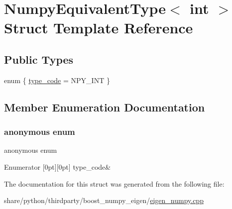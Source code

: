 \hypertarget{structNumpyEquivalentType_3_01int_01_4}{}\section{Numpy\+Equivalent\+Type$<$ int $>$ Struct Template Reference}
\label{structNumpyEquivalentType_3_01int_01_4}
\subsection*{Public Types}
\begin{DoxyCompactItemize}
\item 
enum \{ \hyperlink{structNumpyEquivalentType_3_01int_01_4_a92b5bf5d86c587a4d3db85533bc24344a74833ffcb94b293300bd55aa55c6f828}{type\+\_\+code} = N\+P\+Y\+\_\+\+I\+NT
 \}
\end{DoxyCompactItemize}


\subsection{Member Enumeration Documentation}
\mbox{\label{structNumpyEquivalentType_3_01int_01_4_a92b5bf5d86c587a4d3db85533bc24344}} 
\subsubsection{\texorpdfstring{anonymous enum}{anonymous enum}}
{\footnotesize\ttfamily anonymous enum}

\begin{DoxyEnumFields}{Enumerator}
[0pt][0pt]{}\mbox{\label{structNumpyEquivalentType_3_01int_01_4_a92b5bf5d86c587a4d3db85533bc24344a74833ffcb94b293300bd55aa55c6f828}} 
type\+\_\+code&\\
\hline

\end{DoxyEnumFields}


The documentation for this struct was generated from the following file\+:\begin{DoxyCompactItemize}
\item 
share/python/thirdparty/boost\+\_\+numpy\+\_\+eigen/\hyperlink{eigen__numpy_8cpp}{eigen\+\_\+numpy.\+cpp}\end{DoxyCompactItemize}

